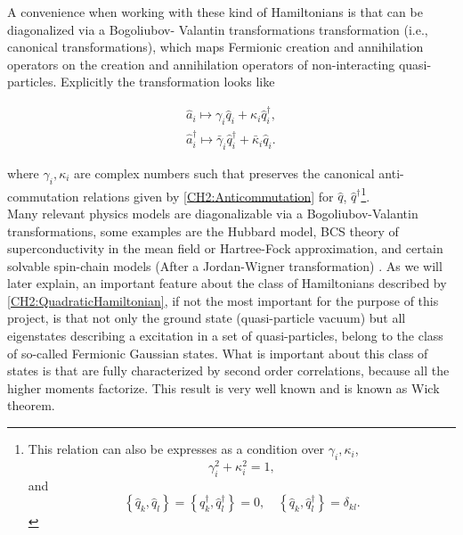 A convenience when working with these kind of Hamiltonians is that can be diagonalized via a Bogoliubov- Valantin transformations transformation (i.e., canonical transformations), which maps Fermionic creation and annihilation operators on the creation and annihilation operators of non-interacting quasi-particles\cite{berezin_method_1966,bogoljubov_new_1958}. Explicitly the transformation looks like

\begin{equation}
\begin{array}{c}
\hat{a}_{i} \mapsto \gamma_{i} \hat{q}_{i}+\kappa_{i} \hat{q}_{i}^{\dagger}, \\
\hat{a}_{i}^{\dagger} \mapsto \bar{\gamma}_{i} \hat{q}_{i}^{\dagger}+\bar{\kappa}_{i} \hat{q}_{i}.
\end{array}
\label{CH2:Bogoliuvov}
\end{equation}

where $\gamma_i , \kappa_i$ are complex numbers such that preserves the canonical anti-commutation relations given by \eqref{CH2:Anticommutation} for $\hat{q}$, $\hat{q}^{\dagger}$\footnote{This relation can also be expresses as a condition over $\gamma_i , \kappa_i$,
\[ \gamma_i ^2+ \kappa_i^2 = 1,\]
and 
\[\left\{\hat{q}_{k}, \hat{q}_{l}\right\}=\left\{\hat{q}_{k}^{\dagger}, \hat{q}_{l}^{\dagger}\right\}=0, \quad\left\{\hat{q}_{k}, \hat{q}_{l}^{\dagger}\right\}=\delta_{k l}.\]
 }.
\\
Many relevant physics models are diagonalizable via a Bogoliubov-Valantin transformations, some examples are the Hubbard model, BCS theory of superconductivity in the mean field or Hartree-Fock approximation, and certain solvable spin-chain models (After a Jordan-Wigner transformation) \cite{fradkin_field_1997}. As we will later explain, an important feature about the class of Hamiltonians described by \eqref{CH2:QuadraticHamiltonian}, if not the most important for the purpose of this project,  is that not only the ground state (quasi-particle vacuum)  but all eigenstates describing a excitation  in a set of quasi-particles, belong to the class of so-called Fermionic Gaussian states\cite{botero_bcs-like_2004}. What is important about this class of states is that are fully characterized by second order correlations, because all the higher moments factorize. This result is very well known and is known as Wick theorem.

